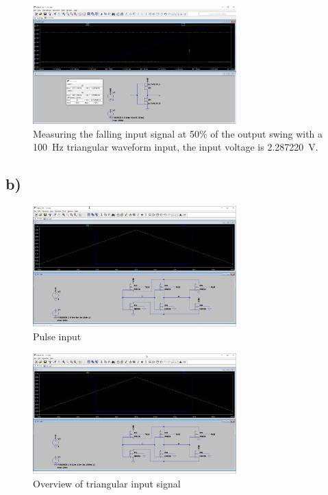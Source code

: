 \documentclass{article}
\begin{document}
	\begin{figure}[H]
	    \centering
	    \includegraphics[width=0.7\textwidth]{1a-3-6-sim}
	    \caption[Measuring the falling input signal]{Measuring the falling input signal at 50\% of the output swing with a \SI{100}{Hz} triangular waveform input, the input voltage is \SI{2.287220}{V}.}
	\end{figure}


	\subsection*{b)}

	\begin{figure}[H]
	    \centering
	    \includegraphics[width=0.7\textwidth]{1b-1-1-sim}
	    \caption{Pulse input}
	\end{figure}
		
	\begin{figure}[H]
	    \centering
	    \includegraphics[width=0.7\textwidth]{1b-2-1-sim}
	    \caption{Overview of triangular input signal}
	\end{figure}
	
\end{document}
